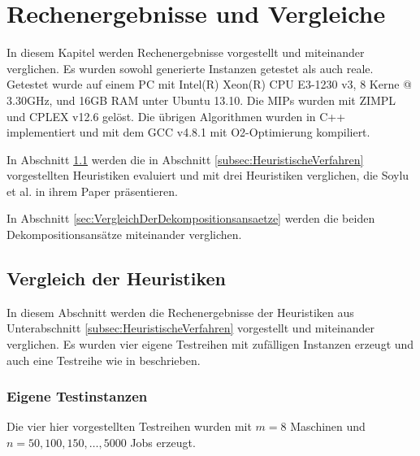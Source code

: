 \documentclass{scrreprt}
\begin{document}
\chapter{Rechenergebnisse und Vergleiche}
\label{chap:RechenergebnisseUndVergleiche}
In diesem Kapitel werden Rechenergebnisse vorgestellt und miteinander verglichen.
Es wurden sowohl generierte Instanzen getestet als auch reale.
Getestet wurde auf einem PC mit Intel(R) Xeon(R) CPU E3-1230 v3, 8 Kerne @ 3.30GHz, und 16GB RAM unter Ubuntu 13.10.
Die MIPs wurden mit ZIMPL \cite{Koch2004} und CPLEX v12.6 gelöst.
Die übrigen Algorithmen wurden in C++ implementiert und mit dem GCC v4.8.1 mit O2-Optimierung kompiliert.

In Abschnitt \ref{subsec:VergleichDerHeuristiken} werden die in Abschnitt \ref{subsec:HeuristischeVerfahren} vorgestellten Heuristiken evaluiert
und mit drei Heuristiken verglichen, die Soylu et al. in ihrem Paper \cite{soylu} präsentieren.

In Abschnitt \ref{sec:VergleichDerDekompositionsansaetze} werden die beiden Dekompositionsansätze miteinander verglichen.


\section{Vergleich der Heuristiken}
\label{subsec:VergleichDerHeuristiken}
In diesem Abschnitt werden die Rechenergebnisse der Heuristiken aus Unterabschnitt \ref{subsec:HeuristischeVerfahren} vorgestellt und miteinander verglichen.
Es wurden vier eigene Testreihen mit zufälligen Instanzen erzeugt und auch eine Testreihe wie in \cite{soylu} beschrieben. 

\subsection{Eigene Testinstanzen}
Die vier hier vorgestellten Testreihen wurden mit $m=8$ Maschinen und $n=50,100,150,\ldots,5000$ Jobs erzeugt.
\end{document}

